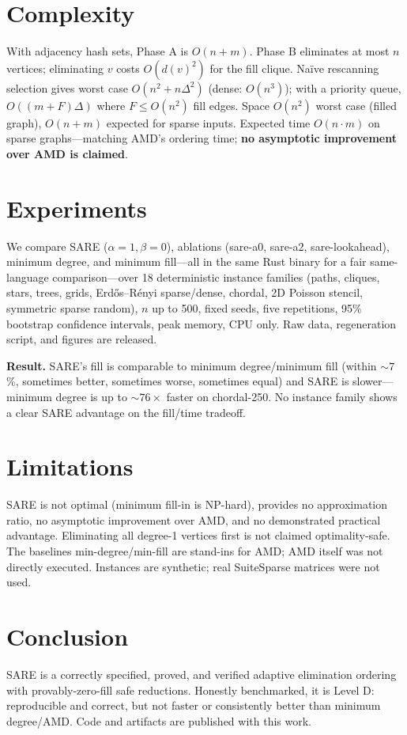 \documentclass[11pt]{article}
\theoremstyle{plain}
\theoremstyle{definition}
\begin{document}
\section{Complexity}
With adjacency hash sets, Phase A is $O(n+m)$. Phase B eliminates at most $n$ vertices;
eliminating $v$ costs $O(d(v)^2)$ for the fill clique. Na\"ive rescanning selection gives
worst case $O(n^2+n\Delta^2)$ (dense: $O(n^3)$); with a priority queue,
$O((m+F)\Delta)$ where $F\le O(n^2)$ fill edges. Space $O(n^2)$ worst case (filled graph),
$O(n+m)$ expected for sparse inputs. Expected time $O(n\cdot m)$ on sparse graphs---matching
AMD's ordering time; \textbf{no asymptotic improvement over AMD is claimed}.

\section{Experiments}
We compare SARE ($\alpha=1,\beta=0$), ablations (sare-a0, sare-a2, sare-lookahead),
minimum degree, and minimum fill---all in the same Rust binary for a fair same-language
comparison---over 18 deterministic instance families (paths, cliques, stars, trees, grids,
Erd\H{o}s--R\'enyi sparse/dense, chordal, 2D Poisson stencil, symmetric sparse random),
$n$ up to 500, fixed seeds, five repetitions, 95\% bootstrap confidence intervals, peak
memory, CPU only. Raw data, regeneration script, and figures are released.

\textbf{Result.} SARE's fill is comparable to minimum degree/minimum fill (within $\sim7$\%,
sometimes better, sometimes worse, sometimes equal) and SARE is slower---minimum degree is
up to $\sim76\times$ faster on chordal-250. No instance family shows a clear SARE advantage
on the fill/time tradeoff.

\section{Limitations}
SARE is not optimal (minimum fill-in is NP-hard), provides no approximation ratio, no
asymptotic improvement over AMD, and no demonstrated practical advantage. Eliminating all
degree-1 vertices first is not claimed optimality-safe. The baselines min-degree/min-fill are
stand-ins for AMD; AMD itself was not directly executed. Instances are synthetic; real
SuiteSparse matrices were not used.

\section{Conclusion}
SARE is a correctly specified, proved, and verified adaptive elimination ordering with
provably-zero-fill safe reductions. Honestly benchmarked, it is Level D: reproducible and
correct, but not faster or consistently better than minimum degree/AMD. Code and artifacts
are published with this work.
\end{document}

